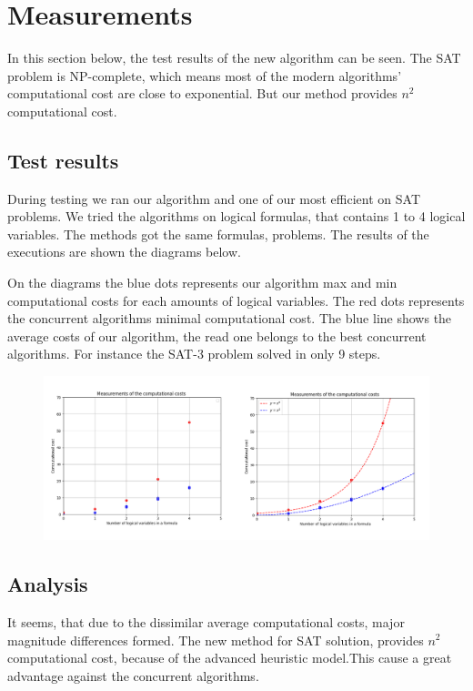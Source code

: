\documentclass[12pt] {article}
\begin{document}
\section{Measurements}
In this section below, the test results of the new algorithm can be seen. The SAT problem is NP-complete, which means most of the modern algorithms' computational cost are close to exponential. But our method provides $n^{2}$ computational cost.

\subsection{Test results}
During testing we ran our algorithm and one of our most efficient on SAT problems. We tried the algorithms on logical formulas, that contains 1 to 4 logical variables. The methods got the same formulas, problems. The results of the executions are shown the diagrams below.

On the diagrams the blue dots represents our algorithm max and min computational costs for each amounts of logical variables. The red dots represents the concurrent algorithms minimal computational cost. The blue line shows the average costs of our algorithm, the read one belongs to the best concurrent algorithms. For instance the SAT-3 problem solved in only 9 steps.

\begin{figure}[h]
    \centering
    \includegraphics[width=1\linewidth]{img/measurements.png}
\end{figure}

\subsection{Analysis}
It seems, that due to the dissimilar average computational costs, major magnitude differences formed. The new method for SAT solution, provides $n^{2}$ computational cost, because of the advanced heuristic model.This cause a great advantage against the concurrent algorithms.
\end{document}
